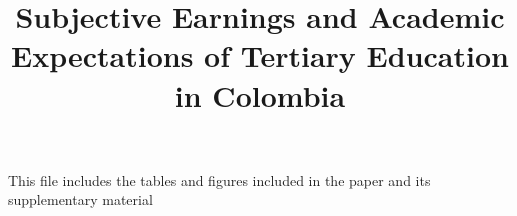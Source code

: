 \documentclass[12pt]{article}
\date{}
\title{Subjective Earnings and Academic Expectations of Tertiary Education in Colombia}
\begin{document}
	
\maketitle
This file includes the tables and figures included in the paper and its supplementary material
	


\end{document}
